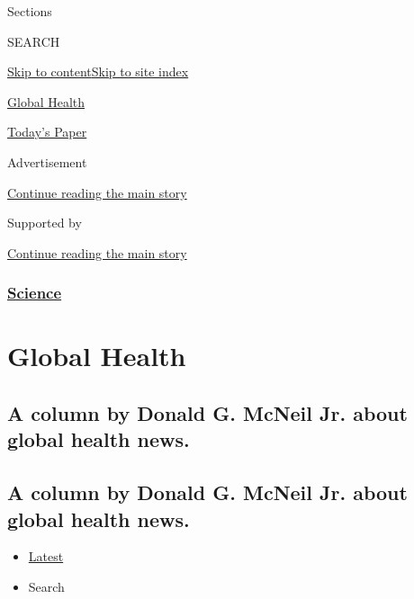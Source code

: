 Sections

SEARCH

\protect\hyperlink{site-content}{Skip to
content}\protect\hyperlink{site-index}{Skip to site index}

\href{https://www.nytimes3xbfgragh.onion/column/global-health}{Global
Health}

\href{https://myaccount.nytimes3xbfgragh.onion/auth/login?response_type=cookie\&client_id=vi}{}

\href{https://www.nytimes3xbfgragh.onion/section/todayspaper}{Today's
Paper}

Advertisement

\protect\hyperlink{after-top}{Continue reading the main story}

Supported by

\protect\hyperlink{after-sponsor}{Continue reading the main story}

\hypertarget{science}{%
\subsubsection{\texorpdfstring{\href{/section/science}{Science}}{Science}}\label{science}}

\hypertarget{global-health}{%
\section{Global Health}\label{global-health}}

\hypertarget{a-column-by-donald-g-mcneil-jr-about-global-health-news}{%
\subsection{A column by Donald G. McNeil Jr. about global health
news.}\label{a-column-by-donald-g-mcneil-jr-about-global-health-news}}

\hypertarget{a-column-by-donald-g-mcneil-jr-about-global-health-news-1}{%
\subsection{A column by Donald G. McNeil Jr. about global health
news.}\label{a-column-by-donald-g-mcneil-jr-about-global-health-news-1}}

\begin{itemize}
\tightlist
\item
  \protect\hyperlink{stream-panel}{Latest}
\item
  Search
\end{itemize}

